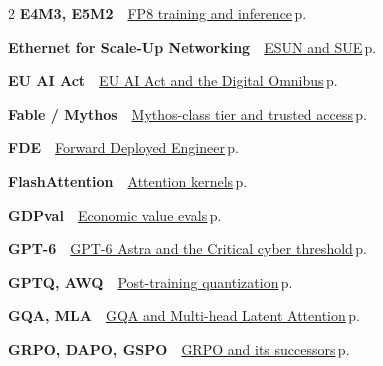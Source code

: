\documentclass[10pt,a4paper,openany]{report}
\begin{document}
\begin{multicols}{2}
\textbf{\sffamily\color{accent}E4M3, E5M2}\ \ \hyperref[c:quant-2]{FP8 training and inference}\,{\color{muted}\scriptsize p.\,\pageref{c:quant-2}}\par\vspace{2pt}
\textbf{\sffamily\color{accent}Ethernet for Scale-Up Networking}\ \ \hyperref[c:hardware-4]{ESUN and SUE}\,{\color{muted}\scriptsize p.\,\pageref{c:hardware-4}}\par\vspace{2pt}
\textbf{\sffamily\color{accent}EU AI Act}\ \ \hyperref[c:safety-11]{EU AI Act and the Digital Omnibus}\,{\color{muted}\scriptsize p.\,\pageref{c:safety-11}}\par\vspace{2pt}
\textbf{\sffamily\color{accent}Fable / Mythos}\ \ \hyperref[c:landscape-0]{Mythos-class tier and trusted access}\,{\color{muted}\scriptsize p.\,\pageref{c:landscape-0}}\par\vspace{2pt}
\textbf{\sffamily\color{accent}FDE}\ \ \hyperref[c:practice-0]{Forward Deployed Engineer}\,{\color{muted}\scriptsize p.\,\pageref{c:practice-0}}\par\vspace{2pt}
\textbf{\sffamily\color{accent}FlashAttention}\ \ \hyperref[c:inference-5]{Attention kernels}\,{\color{muted}\scriptsize p.\,\pageref{c:inference-5}}\par\vspace{2pt}
\textbf{\sffamily\color{accent}GDPval}\ \ \hyperref[c:evals-7]{Economic value evals}\,{\color{muted}\scriptsize p.\,\pageref{c:evals-7}}\par\vspace{2pt}
\textbf{\sffamily\color{accent}GPT-6}\ \ \hyperref[c:landscape-1]{GPT-6 Astra and the Critical cyber threshold}\,{\color{muted}\scriptsize p.\,\pageref{c:landscape-1}}\par\vspace{2pt}
\textbf{\sffamily\color{accent}GPTQ, AWQ}\ \ \hyperref[c:quant-3]{Post-training quantization}\,{\color{muted}\scriptsize p.\,\pageref{c:quant-3}}\par\vspace{2pt}
\textbf{\sffamily\color{accent}GQA, MLA}\ \ \hyperref[c:arch-1]{GQA and Multi-head Latent Attention}\,{\color{muted}\scriptsize p.\,\pageref{c:arch-1}}\par\vspace{2pt}
\textbf{\sffamily\color{accent}GRPO, DAPO, GSPO}\ \ \hyperref[c:reasoning-4]{GRPO and its successors}\,{\color{muted}\scriptsize p.\,\pageref{c:reasoning-4}}\par\vspace{2pt}

\end{multicols}
\end{document}
